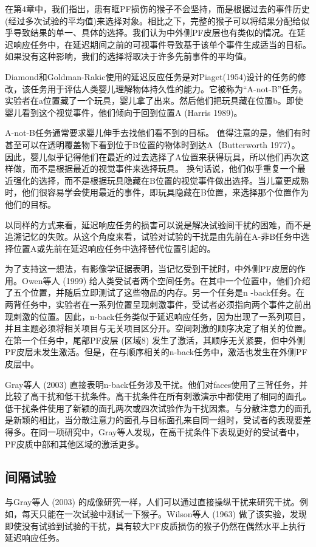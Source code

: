 在第4章中，我们指出，患有眶PF损伤的猴子不会坚持，而是根据过去的事件历史(经过多次试验的平均值)来选择对象。相比之下，完整的猴子可以将结果分配给似乎导致结果的单一、具体的选择。我们认为中外侧PF皮层也有类似的情况。在延迟响应任务中，在延迟期间之前的可视事件导致基于该单个事件生成适当的目标。如果没有这种影响，我们的选择将取决于许多先前事件的平均值。

Diamond和Goldman-Rakic使用的延迟反应任务是对Piaget(1954)设计的任务的修改，该任务用于评估人类婴儿理解物体持久性的能力。它被称为“A-not-B”任务。实验者在a位置藏了一个玩具，婴儿拿了出来。然后他们把玩具藏在位置b。即使婴儿看到这个视觉事件，他们倾向于回到位置A (Harris 1989)。

A-not-B任务通常要求婴儿伸手去找他们看不到的目标。 值得注意的是，他们有时甚至可以在透明覆盖物下看到位于B位置的物体时到达A（Butterworth 1977）。 因此，婴儿似乎记得他们在最近的过去选择了A位置来获得玩具，所以他们再次这样做，而不是根据最近的视觉事件来选择玩具。 换句话说，他们似乎重复一个最近强化的选择，而不是根据玩具隐藏在B位置的视觉事件做出选择。当儿童更成熟时，他们很容易学会使用最近的事件，即玩具隐藏在B位置，来选择那个位置作为他们的目标。

以同样的方式来看，延迟响应任务的损害可以说是解决试验间干扰的困难，而不是追溯记忆的失败。从这个角度来看，试验对试验的干扰是由先前在A-非B任务中选择位置A或先前在延迟响应任务中选择替代位置引起的。

为了支持这一想法，有影像学证据表明，当记忆受到干扰时，中外侧PF皮层的作用。Owen等人 (1999) 给人类受试者两个空间任务。在其中一个位置中，他们介绍了五个位置，并随后立即测试了这些物品的内存。另一个任务是n -back任务。在两背任务中，实验者在一系列位置呈现刺激事件，受试者必须指向两个事件之前出现刺激的位置。因此，n-back任务类似于延迟响应任务，因为出现了一系列项目，并且主题必须将相关项目与无关项目区分开。空间刺激的顺序决定了相关的位置。在第一个任务中，尾部PF皮层 (区域8) 发生了激活，其顺序无关紧要，但中外侧PF皮层未发生激活。但是，在与顺序相关的n-back任务中，激活也发生在外侧PF皮层中。

Gray等人 (2003) 直接表明n-back任务涉及干扰。他们对faces使用了三背任务，并比较了高干扰和低干扰条件。高干扰条件在所有刺激演示中都使用了相同的面孔。低干扰条件使用了新颖的面孔两次或四次试验作为干扰因素。与分散注意力的面孔是新颖的相比，当分散注意力的面孔与目标面孔来自同一组时，受试者的表现要差得多。在同一项研究中，Gray等人发现，在高干扰条件下表现更好的受试者中，PF皮质中部和其他区域的激活更多。

\subsection{间隔试验}
与Gray等人 (2003) 的成像研究一样，人们可以通过直接操纵干扰来研究干扰。例如，每天只能在一次试验中测试一下猴子。Wilson等人 (1963) 做了该实验，发现即使没有试验到试验的干扰，具有较大PF皮质损伤的猴子仍然在偶然水平上执行延迟响应任务。

